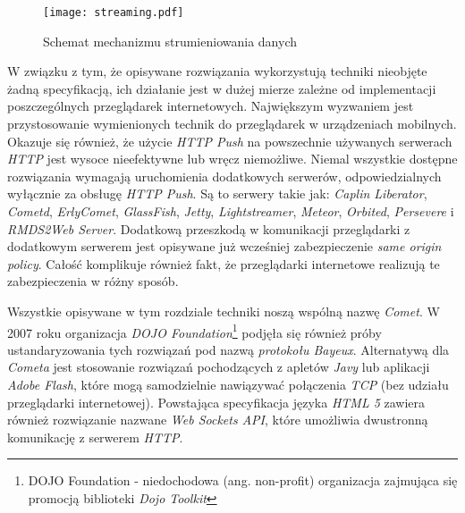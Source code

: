 \documentclass[11pt,twoside]{report}
\begin{document}
\begin{figure}[ht]
  \begin{center}
    \texttt{[image: streaming.pdf]}
  \end{center}
  \caption{Schemat mechanizmu strumieniowania danych}
  \label{streaming}
\end{figure}

W związku z tym, że opisywane rozwiązania wykorzystują techniki
nieobjęte żadną specyfikacją, ich działanie jest w dużej mierze
zależne od implementacji poszczególnych przeglądarek
internetowych. Największym wyzwaniem jest przystosowanie wymienionych
technik do przeglądarek w urządzeniach mobilnych. Okazuje się również,
że użycie \emph{HTTP Push} na powszechnie używanych serwerach
\emph{HTTP} jest wysoce nieefektywne lub wręcz niemożliwe. Niemal
wszystkie dostępne rozwiązania wymagają uruchomienia dodatkowych
serwerów, odpowiedzialnych wyłącznie za obsługę \emph{HTTP Push}. Są
to serwery takie jak: \emph{Caplin Liberator}, \emph{Cometd},
\emph{ErlyComet}, \emph{GlassFish}, \emph{Jetty},
\emph{Lightstreamer}, \emph{Meteor}, \emph{Orbited}, \emph{Persevere}
i \emph{RMDS2Web Server}\cite{cometmaturity}. Dodatkową przeszkodą w
komunikacji przeglądarki z dodatkowym serwerem jest opisywane już
wcześniej zabezpieczenie \emph{same origin policy}. Całość komplikuje
również fakt, że przeglądarki internetowe realizują te zabezpieczenia
w różny sposób\cite{xssinfo}.

Wszystkie opisywane w tym rozdziale techniki noszą wspólną nazwę
\emph{Comet}\cite{comet}. W 2007 roku organizacja \emph{DOJO
  Foundation}\footnote{DOJO Foundation - niedochodowa
  (ang. non-profit) organizacja zajmująca się promocją biblioteki
  \emph{Dojo Toolkit}} podjęła się również próby ustandaryzowania tych
rozwiązań pod nazwą \emph{protokołu Bayeux}\cite{bayeux}. Alternatywą
dla \emph{Cometa} jest stosowanie rozwiązań pochodzących z apletów
\emph{Javy} lub aplikacji \emph{Adobe Flash}, które mogą samodzielnie
nawiązywać połączenia \emph{TCP} (bez udziału przeglądarki
internetowej). Powstająca specyfikacja języka \emph{HTML 5} zawiera
również rozwiązanie nazwane \emph{Web Sockets API}, które umożliwia
dwustronną komunikację z serwerem \emph{HTTP}\cite{websockets}.
\end{document}
